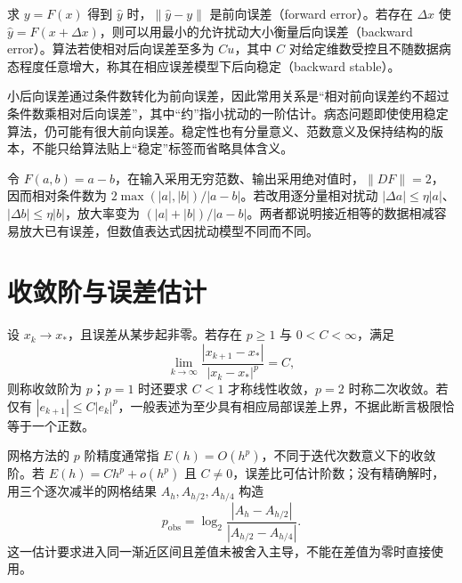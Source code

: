 \documentclass[UTF8,12pt,a4paper,fontset=fandol]{ctexbook}
\begin{document}
\begin{definition}
求 $y=F(x)$ 得到 $\widehat y$ 时，$\|\widehat y-y\|$ 是前向误差（forward error）。若存在 $\Delta x$ 使 $\widehat y=F(x+\Delta x)$，则可以用最小的允许扰动大小衡量后向误差（backward error）。算法若使相对后向误差至多为 $Cu$，其中 $C$ 对给定维数受控且不随数据病态程度任意增大，称其在相应误差模型下后向稳定（backward stable）。
\end{definition}

小后向误差通过条件数转化为前向误差，因此常用关系是“相对前向误差约不超过条件数乘相对后向误差”，其中“约”指小扰动的一阶估计。病态问题即使使用稳定算法，仍可能有很大前向误差。稳定性也有分量意义、范数意义及保持结构的版本，不能只给算法贴上“稳定”标签而省略具体含义。

\begin{example}[相减问题的条件数]
令 $F(a,b)=a-b$，在输入采用无穷范数、输出采用绝对值时，$\|DF\|=2$，因而相对条件数为 $2\max(|a|,|b|)/|a-b|$。若改用逐分量相对扰动 $|\Delta a|\le\eta|a|$、$|\Delta b|\le\eta|b|$，放大率变为 $(|a|+|b|)/|a-b|$。两者都说明接近相等的数据相减容易放大已有误差，但数值表达式因扰动模型不同而不同。
\end{example}

\section{收敛阶与误差估计}
\begin{definition}[迭代的收敛阶]
设 $x_k\to x_*$，且误差从某步起非零。若存在 $p\ge1$ 与 $0<C<\infty$，满足
\[
 \lim_{k\to\infty}\frac{|x_{k+1}-x_*|}{|x_k-x_*|^p}=C,
\]
则称收敛阶为 $p$；$p=1$ 时还要求 $C<1$ 才称线性收敛，$p=2$ 时称二次收敛。若仅有 $|e_{k+1}|\le C|e_k|^p$，一般表述为至少具有相应局部误差上界，不据此断言极限恰等于一个正数。
\end{definition}

网格方法的 $p$ 阶精度通常指 $E(h)=O(h^p)$，不同于迭代次数意义下的收敛阶。若 $E(h)=Ch^p+o(h^p)$ 且 $C\ne0$，误差比可估计阶数；没有精确解时，用三个逐次减半的网格结果 $A_h,A_{h/2},A_{h/4}$ 构造
\[
 p_{\mathrm{obs}}=\log_2\frac{|A_h-A_{h/2}|}{|A_{h/2}-A_{h/4}|}.
\]
这一估计要求进入同一渐近区间且差值未被舍入主导，不能在差值为零时直接使用。
\end{document}
